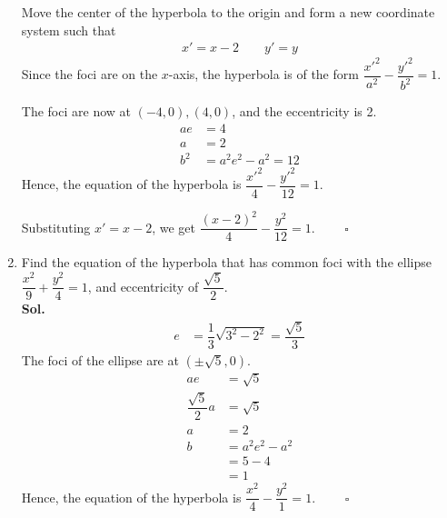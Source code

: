 \documentclass{report}
\newcommand{\sol}{\vspace{1em}\\\textbf{Sol.}}
\newcommand{\eos}{ \qquad \square}
\begin{document}
\begin{enumerate}[leftmargin=*]
          Move the center of the hyperbola to the origin and form a new coordinate system
          such that
          \begin{align*}
              x' = x-2 \qquad y' = y
          \end{align*}
          Since the foci are on the $x$-axis, the hyperbola is of the form
          $\dfrac{x'^2}{a^2}-\dfrac{y'^2}{b^2}=1$.

          The foci are now at $(-4, 0), (4, 0)$, and the eccentricity is 2.
          \begin{align*}
              ae  & = 4                 \\
              a   & = 2                 \\
              b^2 & = a^2e^2 - a^2 = 12
          \end{align*}
          Hence, the equation of the hyperbola is $\dfrac{x'^2}{4}-\dfrac{y'^2}{12}=1$.

          Substituting $x' = x-2$, we get $\dfrac{(x-2)^2}{4}-\dfrac{y^2}{12}=1$. $\eos$

    \item Find the equation of the hyperbola that has common foci with the ellipse
          $\dfrac{x^2}{9}+\dfrac{y^2}{4}=1$, and eccentricity of $\dfrac{\sqrt{5}}{2}$.
          \sol{}
          \begin{align*}
              e & = \dfrac{1}{3}\sqrt{3^2 - 2^2} = \dfrac{\sqrt{5}}{3}
          \end{align*}
          The foci of the ellipse are at $(\pm \sqrt{5}, 0)$.
          \begin{align*}
              ae                   & = \sqrt{5}     \\
              \dfrac{\sqrt{5}}{2}a & = \sqrt{5}     \\
              a                    & = 2            \\
              b                    & = a^2e^2 - a^2 \\
                                   & = 5 - 4        \\
                                   & = 1
          \end{align*}
          Hence, the equation of the hyperbola is $\dfrac{x^2}{4}-\dfrac{y^2}{1}=1$. $\eos$


\end{enumerate}
\end{document}
